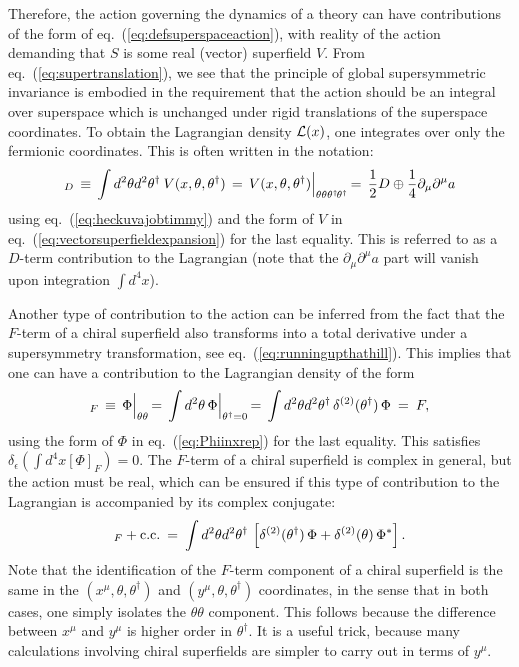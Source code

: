 \documentclass[12pt]{article}
\def\BDminus{-}
\def\BDminus{+}
\def\BDminus{\ominus}
\def\BDminus{\oplus}
\newcommand{\thdthd}{\theta^\dagger\hspace{-1pt}\theta^\dagger}
\def\beq{\begin{eqnarray}}
\def\eeq{\end{eqnarray}}
\begin{document}
Therefore, the action governing the dynamics of a theory can have 
contributions of the form of eq.~(\ref{eq:defsuperspaceaction}), with 
reality of the action demanding that $S$ is some real (vector) superfield 
$V$. From eq.~(\ref{eq:supertranslation}), we see that the principle of 
global supersymmetric invariance is embodied in the requirement that the 
action should be an integral over superspace which is unchanged under 
rigid translations of the superspace coordinates. To obtain the 
Lagrangian density ${\cal L}(x)$, one integrates over only the fermionic 
coordinates. This is often written in the notation:
\beq
[V]_D \,\equiv\, \int d^2\theta d^2\theta^\dagger\> V(x,\theta,\theta^\dagger) 
\,=\, 
V(x,\theta,\theta^\dagger) \Bigl |_{\theta\theta\thdthd}
\,=\,
\frac{1}{2} D \BDminus \frac{1}{4} \partial_\mu \partial^\mu a
\label{eq:DtermLag}
\eeq
using eq.~(\ref{eq:heckuvajobtimmy}) and the form of $V$ 
in eq.~(\ref{eq:vectorsuperfieldexpansion}) for the last equality. This is 
referred to as a 
$D$-term contribution to the Lagrangian
(note that the $\partial_\mu \partial^\mu a$ part will 
vanish upon integration $\int d^4 x$). 

Another type of contribution to the action can be inferred from the fact 
that the $F$-term of a chiral superfield also transforms into a total 
derivative under a supersymmetry transformation, see 
eq.~(\ref{eq:runningupthathill}). 
This implies that 
one can have a 
contribution to the Lagrangian density of the form
\beq
[\Phi]_F \,\equiv\, \Phi \Bigl |_{\theta\theta} \,=\, 
\int d^2\theta\, \Phi \Bigl |_{\theta^\dagger =0} \,=\, 
\int d^2\theta d^2\theta^\dagger\,
\delta^{(2)}(\theta^\dagger)
\,
\Phi \>=\>F,
\label{eq:PhiF}
\eeq
using the form of $\Phi$ in eq.~(\ref{eq:Phiinxrep}) for the last equality.
This satisfies $\delta_{\epsilon} (\int d^4 x [\Phi]_F) = 0$.
The $F$-term of a chiral superfield 
is complex in general, but 
the action must be real, which can be ensured if  
this type of contribution to the Lagrangian is accompanied
by its complex conjugate:
\beq
[\Phi]_F + {\rm c.c.} \>=\> 
\int d^2\theta d^2\theta^\dagger\,
\left [ 
\delta^{(2)}(\theta^\dagger) 
\,
\Phi 
+
\delta^{(2)}(\theta) 
\,
\Phi^* 
\right ].
\label{eq:FtermLag}
\eeq
Note that the identification of the $F$-term component of a chiral superfield is 
the same in the $(x^\mu,\theta,\theta^\dagger)$ and 
$(y^\mu,\theta,\theta^\dagger)$ coordinates, in the sense that in both cases, one 
simply isolates the $\theta\theta$ component. This follows because the 
difference between $x^\mu$ and $y^\mu$ is higher order in 
$\theta^\dagger$. It is a useful trick, because many 
calculations involving chiral superfields are 
simpler to carry out in terms of $y^\mu$.
\end{document}
